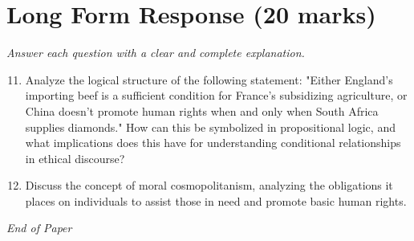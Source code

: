 \documentclass[12pt]{article}
\begin{document}
\section*{Long Form Response (20 marks)}
\textit{Answer each question with a clear and complete explanation.}
\begin{enumerate}[label=\arabic*.]
\setcounter{enumi}{10}
\item Analyze the logical structure of the following statement: "Either England's importing beef is a sufficient condition for France's subsidizing agriculture, or China doesn't promote human rights when and only when South Africa supplies diamonds." How can this be symbolized in propositional logic, and what implications does this have for understanding conditional relationships in ethical discourse?
\item Discuss the concept of moral cosmopolitanism, analyzing the obligations it places on individuals to assist those in need and promote basic human rights.
\end{enumerate}

\vfill
\noindent\textit{End of Paper}
\end{document}
